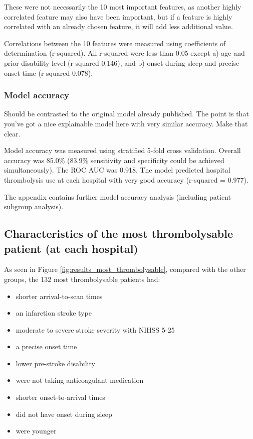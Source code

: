 These were not necessarily the 10 most important features, as another highly correlated feature may also have been important, but if a feature is highly correlated with an already chosen feature, it will add less additional value.

Correlations between the 10 features were measured using coefficients of determination (r-squared). All r-squared were less than 0.05 except a) age and prior disability level (r-squared 0.146), and b) onset during sleep and precise onset time (r-squared 0.078).


\subsubsection{Model accuracy}

Should be contrasted to the original model already published.  The point is that you've got a nice explainable model here with very similar accuracy.  Make that clear.

Model accuracy was measured using stratified 5-fold cross validation. Overall accuracy was 85.0\% (83.9\% sensitivity and specificity could be achieved simultaneously). The ROC AUC was 0.918. The model predicted hospital thrombolysis use at each hospital with very good accuracy (r-squared = 0.977).

The appendix contains further model accuracy analysis (including patient subgroup analysis).

\iffalse
\subsection{Characteristics of the most thrombolysable patient (at each hospital)}

As seen in Figure \ref{fig:results_most_thrombolysable}, compared with the other groups, the 132 most thrombolysable patients had:
\begin{itemize}
    \item shorter arrival-to-scan times
    \item an infarction stroke type
    \item moderate to severe stroke severity with NIHSS 5-25
    \item a precise onset time
    \item lower pre-stroke disability
    \item were not taking anticoagulant medication
    \item shorter onset-to-arrival times
    \item did not have onset during sleep
    \item were younger
\end{itemize}


